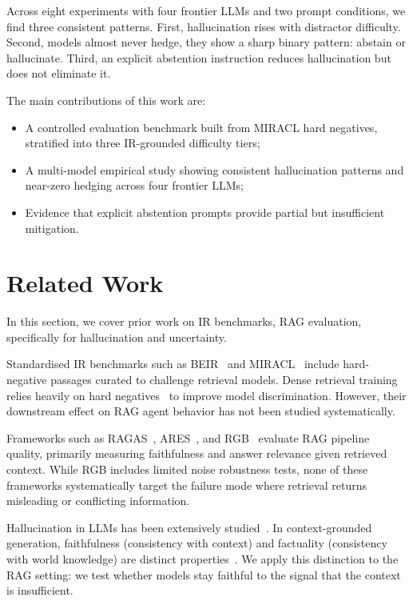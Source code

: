 \documentclass[sigconf,review,anonymous]{acmart}
\begin{document}
Across eight experiments with four frontier LLMs and two prompt conditions, we find three consistent patterns. 
First, hallucination rises with distractor difficulty. 
Second, models almost never hedge, they show a sharp binary pattern: abstain or hallucinate. 
Third, an explicit abstention instruction reduces hallucination but does not eliminate it.


The main contributions of this work are:
\begin{itemize}[leftmargin=*]
  \item A controlled evaluation benchmark built from MIRACL hard negatives, stratified into three IR-grounded difficulty tiers;
  \item A multi-model empirical study showing consistent hallucination patterns and near-zero hedging across four frontier LLMs;
  \item Evidence that explicit abstention prompts provide partial but insufficient mitigation.
\end{itemize}


\section{Related Work}
In this section, we cover prior work on IR benchmarks, RAG evaluation, specifically for hallucination and uncertainty.

Standardised IR benchmarks such as BEIR~\cite{thakur2021beir} and MIRACL~\cite{zhang2023miracl} include hard-negative passages curated to challenge retrieval models. 
Dense retrieval training relies heavily on hard negatives~\cite{karpukhin2020dpr} to improve model discrimination. 
However, their downstream effect on RAG agent behavior has not been studied systematically.

Frameworks such as RAGAS~\cite{es2024ragas}, ARES~\cite{saadfalcon2024ares}, 
and RGB~\cite{chen2024benchmarking} evaluate RAG pipeline quality, 
primarily measuring faithfulness and answer relevance given retrieved context. 
While RGB includes limited noise robustness tests, none of these frameworks 
systematically target the failure mode where retrieval returns misleading or 
conflicting information.

Hallucination in LLMs has been extensively studied~\cite{ji2023survey}. 
In context-grounded generation, faithfulness (consistency with context) and factuality (consistency with world knowledge) are distinct properties~\cite{maynez2020faithfulness}. 
We apply this distinction to the RAG setting: we test whether models stay faithful to the signal that the context is insufficient.
\end{document}
